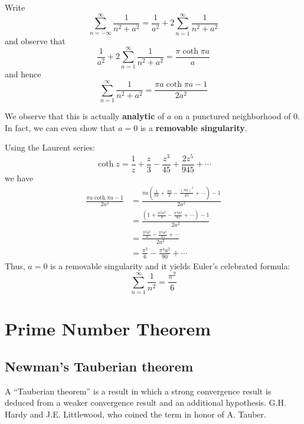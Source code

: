 \documentclass[12pt]{article}
\begin{document}
Write $$\sum_{n=-\infty}^\infty\frac{1}{n^2+a^2}=\frac{1}{a^2}+2\sum_{n=1}^\infty\frac{1}{n^2+a^2}$$ and observe that $$\frac{1}{a^2}+2\sum_{n=1}^\infty\frac{1}{n^2+a^2}=\frac{\pi\coth\pi a}{a}$$ and hence $$\sum_{n=1}^\infty\frac{1}{n^2+a^2}=\frac{\pi a\coth\pi a-1}{2a^2}$$

We observe that this is actually \textbf{analytic}
of $a$ on a punctured neighborhood of 0. In fact, we can even show that $a=0$ is a \textbf{removable singularity}.

Using the Laurent series:
$$\coth z=\frac{1}{z}+\frac{z}{3}-\frac{z^{3}}{45}+\frac{2z^{5}}{945}+\cdots$$
we have
\begin{align*}
    \frac{\pi a\coth\pi a-1}{2a^{2}}&=\frac{\pi a\left(\frac{1}{\pi a}+\frac{\pi a}{3}-\frac{(\pi a)^{3}}{45}+\cdots\right)-1}{2a^{2}}\\
    &=\frac{\left(1+\frac{\pi^{2}a^{2}}{3}-\frac{\pi^{4}a^{4}}{45}+\cdots\right)-1}{2a^{2}}\\
&=\frac{\frac{\pi^{2}a^{2}}{3}-\frac{\pi^{4}a^{4}}{45}+\cdots}{2a^{2}}\\
&=\frac{\pi^{2}}{6}-\frac{\pi^{4}a^{2}}{90}+\cdots
\end{align*}
Thus, $a=0$ is a removable singularity and it yields Euler's celebrated formula:
\[\sum_{n=1}^{\infty}\frac{1}{n^2}= \frac{\pi^2}{6}\]

\section{Prime Number Theorem}
\subsection{Newman's Tauberian theorem}
A ``Tauberian theorem'' is a result in which a strong convergence result is deduced from a weaker convergence result and an additional hypothesis. G.H. Hardy and J.E. Littlewood, who coined the term in honor of A. Tauber. 
\end{document}
